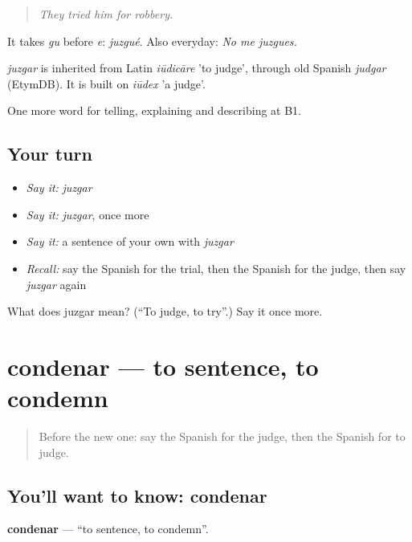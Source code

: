 \begin{quote}
\emph{They tried him for robbery.}
\end{quote}

It takes \emph{gu} before \emph{e}: \emph{juzgué}. Also everyday: \emph{No me juzgues.}

\begin{cousinweb}
\emph{juzgar} is inherited from Latin \emph{iūdicāre} 'to judge', through old Spanish \emph{judgar} (EtymDB). It is built on \emph{iūdex} 'a judge'.
\end{cousinweb}

\begin{grammarlens}[title={What you've built}]
One more word for telling, explaining and describing at B1.
\end{grammarlens}

\subsection*{Your turn}
\begin{itemize}
\raggedright
  \item \emph{Say it:} \emph{juzgar}
  \item \emph{Say it:} \emph{juzgar}, once more
  \item \emph{Say it:} a sentence of your own with \emph{juzgar}
  \item \emph{Recall:} say the Spanish for the trial, then the Spanish for the judge, then say \emph{juzgar} again
\end{itemize}

\begin{tcolorbox}[breakable,colback=teal!4,colframe=teal!35!black,title={Before you move on}]
What does juzgar mean? (\textquotedblleft{}To judge, to try\textquotedblright{}.) Say it once more.
\end{tcolorbox}
\section[condenar]{condenar — to sentence, to condemn}

\label{lesson:ES-C522-condenar}



\begin{quote}
Before the new one: say the Spanish for the judge, then the Spanish for to judge.
\end{quote}

\subsection*{You'll want to know: condenar}
\textbf{condenar} — \textquotedblleft{}to sentence, to condemn\textquotedblright{}.

